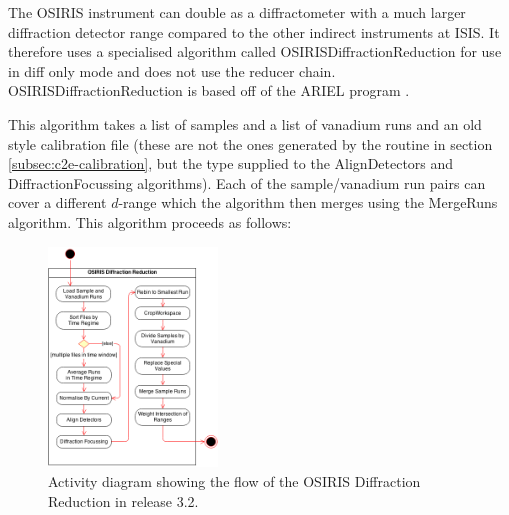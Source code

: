 \documentclass[paper=a4, fontsize=11pt]{scrartcl}	%
\numberwithin{equation}{section}															%
\numberwithin{figure}{section}																%
\numberwithin{table}{section}																%
\begin{document}
The OSIRIS instrument can double as a diffractometer with a much larger diffraction detector range compared to the other indirect instruments at ISIS. It therefore uses a specialised algorithm called OSIRISDiffractionReduction for use in diff only mode and does not use the reducer chain. OSIRISDiffractionReduction is based off of the ARIEL program \cite{pradaelli2000ariel}. 

This algorithm takes a list of samples and a list of vanadium runs and an old style calibration file (these are not the ones generated by the routine in section \ref{subsec:c2e-calibration}, but the type supplied to the AlignDetectors and DiffractionFocussing algorithms). Each of the sample/vanadium run pairs can cover a different $d$-range which the algorithm then merges using the MergeRuns algorithm. This algorithm proceeds as follows:

\begin{figure}[H]
\centering
\includegraphics[width=0.4\textwidth]{img/uml/activity_diagrams/OSIRISDiffractionReduction_activity.png}
\caption{Activity diagram showing the flow of the OSIRIS Diffraction Reduction in release 3.2.}
\label{fig:OSIRISdiffraction-class-diagram}
\end{figure}
\end{document}
